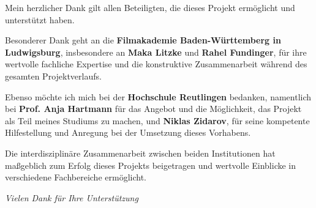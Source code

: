 
\vspace{4cm}

Mein herzlicher Dank gilt allen Beteiligten, die dieses Projekt ermöglicht und unterstützt haben.

\vspace{1em}

Besonderer Dank geht an die \textbf{Filmakademie Baden-Württemberg in Ludwigsburg}, insbesondere an \textbf{Maka Litzke} und \textbf{Rahel Fundinger}, für ihre wertvolle fachliche Expertise und die konstruktive Zusammenarbeit während des gesamten Projektverlaufs.

\vspace{1em}

Ebenso möchte ich mich bei der \textbf{Hochschule Reutlingen} bedanken, namentlich bei \textbf{Prof. Anja Hartmann} für das Angebot und die Möglichkeit, das Projekt als Teil meines Studiums zu machen, und \textbf{Niklas Zidarov}, für seine kompetente Hilfestellung und Anregung bei der Umsetzung dieses Vorhabens.

\vspace{1em}

Die interdisziplinäre Zusammenarbeit zwischen beiden Institutionen hat maßgeblich zum Erfolg dieses Projekts beigetragen und wertvolle Einblicke in verschiedene Fachbereiche ermöglicht.

\vspace{2cm}

\begin{flushright}
    \textit{Vielen Dank für Ihre Unterstützung}
\end{flushright}